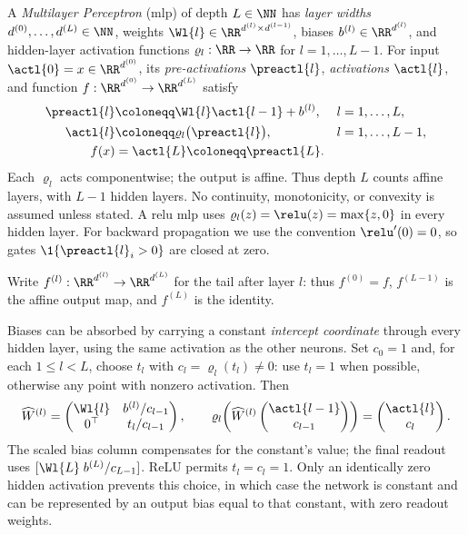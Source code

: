 \begin{definition}\label{def:ffn_relu}
A \emph{Multilayer Perceptron} (\acs{mlp}) of depth $L\in\NN$ has \emph{layer widths} $d^{(0)},\ldots,d^{(L)}\in\NN$, weights $\Wl{l}\in\RR^{d^{(l)}\times d^{(l-1)}}$, biases $b^{(l)}\in\RR^{d^{(l)}}$, and hidden-layer activation functions $\varrho_l:\RR\to\RR$ for $l=1,\ldots,L-1$. For input $\actl{0}=x\in\RR^{d^{(0)}}$, its \emph{pre-activations} $\preactl{l}$, \emph{activations} $\actl{l}$, and function $f:\RR^{d^{(0)}}\to\RR^{d^{(L)}}$ satisfy
\begin{align}
	\preactl{l} &\coloneqq \Wl{l}\actl{l-1}+b^{(l)}, && l=1,\ldots,L, \label{eq:forward_recursion}\\
	\actl{l} &\coloneqq \varrho_l\bigl(\preactl{l}\bigr), && l=1,\ldots,L-1, \notag\\
	f(x) &= \actl{L}\coloneqq\preactl{L}. \label{eq:network_function}
\end{align}
Each $\varrho_l$ acts componentwise; the output is affine. Thus depth $L$ counts affine layers, with $L-1$ hidden layers. No continuity, monotonicity, or convexity is assumed unless stated. A \ac{relu} \ac{mlp} uses $\varrho_l(z)=\relu(z)=\max\{z,0\}$ in every hidden layer. For backward propagation we use the convention $\relu'(0)=0$, so gates $\1\{\preactl{l}_i>0\}$ are closed at zero.
\end{definition}

Write $f^{(l)}:\RR^{d^{(l)}}\to\RR^{d^{(L)}}$ for the tail after layer $l$: thus $f^{(0)}=f$, $f^{(L-1)}$ is the affine output map, and $f^{(L)}$ is the identity.

\begin{remark}\label{rem:bias_augmentation}
Biases can be absorbed by carrying a constant \emph{intercept coordinate} through every hidden layer, using the same activation as the other neurons. Set $c_0=1$ and, for each $1\le l<L$, choose $t_l$ with $c_l=\varrho_l(t_l)\neq0$: use $t_l=1$ when possible, otherwise any point with nonzero activation. Then
\[
\widehat W^{(l)}=
\begin{pmatrix}\Wl{l}&b^{(l)}/c_{l-1}\\0^\top&t_l/c_{l-1}\end{pmatrix},
\qquad
\varrho_l\!\left(\widehat W^{(l)}\begin{pmatrix}\actl{l-1}\\c_{l-1}\end{pmatrix}\right)
=\begin{pmatrix}\actl{l}\\c_l\end{pmatrix}.
\]
The scaled bias column compensates for the constant's value; the final readout uses $[\Wl{L}\;b^{(L)}/c_{L-1}]$. ReLU permits $t_l=c_l=1$. Only an identically zero hidden activation prevents this choice, in which case the network is constant and can be represented by an output bias equal to that constant, with zero readout weights.
\end{remark}

